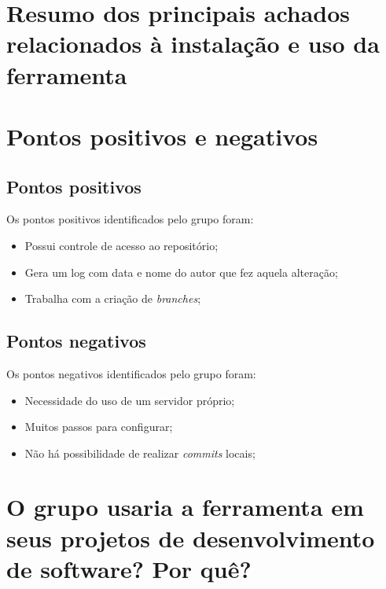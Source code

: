 \section{Resumo dos principais achados relacionados à instalação e uso da ferramenta}
\section{Pontos positivos e negativos}

\subsection{Pontos positivos}

		Os pontos positivos identificados pelo grupo foram:

		\begin{itemize}

			\item Possui controle de acesso ao repositório;
			\item Gera um log com data e nome do autor que fez aquela alteração;
			\item Trabalha com a criação de \textit{branches}; 

		\end{itemize}




	\subsection{Pontos negativos}

		Os pontos negativos identificados pelo grupo foram:

		\begin{itemize}
			\item Necessidade do uso de um servidor próprio;
			\item Muitos passos para configurar;
			\item Não há possibilidade de realizar \textit{commits} locais;

		\end{itemize}

\section{O grupo usaria a ferramenta em seus projetos de desenvolvimento de software? Por quê?}
